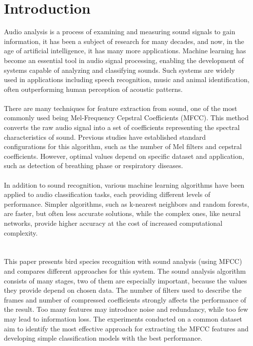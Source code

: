 \documentclass[
onecolumn,
]{ceurart}
\begin{document}
\section{Introduction}
Audio analysis is a process of examining and measuring sound signals to gain information, it has been a subject of research for many decades\cite{hollabaugh1963methods}, and now, in the age of artificial intelligence, it has many more applications. Machine learning has become an essential tool in audio signal processing, enabling the development of systems capable of analyzing and classifying sounds. Such systems are widely used in applications including speech recognition\cite{zhu2025systematic}, music\cite{serrano2022new} and animal identification\cite{wood2023pairing}, often outperforming human perception of acoustic patterns\cite{spille2018comparing}.
\\\ \\
There are many techniques for feature extraction from sound, one of the most commonly used being Mel-Frequency Cepstral Coefficients (MFCC). This method converts the raw audio signal into a set of coefficients representing the spectral characteristics of sound\cite{abdul2022mel}. Previous studies have established standard configurations for this algorithm, such as the number of Mel filters and cepstral coefficients. However, optimal values depend on specific dataset and application, such as detection of breathing phase\cite{zhantleuova2025optimizing} or respiratory diseases\cite{yan2025optimizing}.
\\\ \\
In addition to sound recognition, various machine learning algorithms have been applied to audio classification tasks, each providing different levels of performance. Simpler algorithms, such as k-nearest neighbors and random forests, are faster, but often less accurate solutions, while the complex ones, like neural networks, provide higher accuracy at the cost of increased computational complexity.
\\\ \\\ \\
This paper presents bird species recognition with sound analysis (using MFCC) and compares different approaches for this system. The sound analysis algorithm consists of many stages, two of them are especially important, because the values they provide depend on chosen data. The number of filters used to describe the frames and number of compressed coefficients strongly affects the performance of the result. Too many features may introduce noise and redundancy, while too few may lead to information loss. The experiments conducted on a common dataset aim to identify the most effective approach for extracting the MFCC features and developing simple classification models with the best performance.
\end{document}
